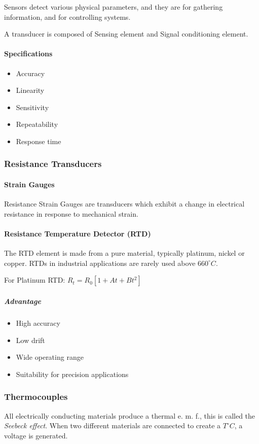 Sensors detect various physical parameters, and they are for gathering information, and for controlling systems.

A transducer is composed of Sensing element and Signal conditioning element.

\paragraph{Specifications}
\begin{itemize}
  \item Accuracy
  \item Linearity
  \item Sensitivity
  \item Repeatability
  \item Response time
\end{itemize}

\subsubsection{Resistance Transducers}
\paragraph{Strain Gauges} Resistance Strain Gauges are transducers which exhibit a change in electrical resistance in response to mechanical strain.

\paragraph{Resistance Temperature Detector (RTD)}
The RTD element is made from a pure material, typically platinum, nickel or copper. RTDs in industrial applications are rarely used above $660^{\circ}C$.

For Platinum RTD: $R_t=R_0[1+At+Bt^2]$
\subparagraph{Advantage}
\begin{itemize}
  \item High accuracy
  \item Low drift
  \item Wide operating range
  \item Suitability for precision applications
\end{itemize}

\subsubsection{Thermocouples}
All electrically conducting materials produce a thermal e. m. f., this is called the \emph{Seebeck effect}. When two different materials are connected to create a $T^\circ C$, a voltage is generated.

